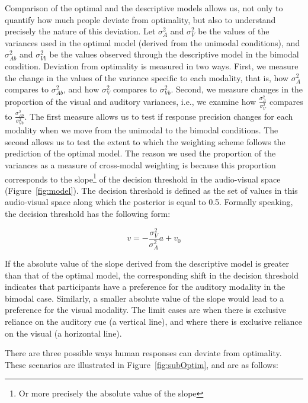 \documentclass[english,floatsintext,man]{apa6}
\theoremstyle{definition}
\theoremstyle{definition}
\theoremstyle{definition}
\theoremstyle{remark}
\begin{document}
Comparison of the optimal and the descriptive models allows us, not only
to quantify how much people deviate from optimality, but also to
understand precisely the nature of this deviation. Let \(\sigma^2_{A}\)
and \(\sigma^2_{V}\) be the values of the variances used in the optimal
model (derived from the unimodal conditions), and \(\sigma^2_{Ab}\) and
\(\sigma^2_{Vb}\) be the values observed through the descriptive model
in the bimodal condition. Deviation from optimality is measured in two
ways. First, we measure the change in the values of the variance
specific to each modality, that is, how \(\sigma^2_{A}\) compares to
\(\sigma^2_{Ab}\), and how \(\sigma^2_{V}\) compares to
\(\sigma^2_{Vb}\). Second, we measure changes in the proportion of the
visual and auditory variances, i.e., we examine how
\(\frac{\sigma^2_{A}}{\sigma^2_{V}}\) compares to
\(\frac{\sigma^2_{Ab}}{\sigma^2_{Vb}}\). The first measure allows us to
test if response precision changes for each modality when we move from
the unimodal to the bimodal conditions. The second allows us to test the
extent to which the weighting scheme follows the prediction of the
optimal model. The reason we used the proportion of the variances as a
measure of cross-modal weighting is because this proportion corresponds
to the slope\footnote{Or more precisely the absolute value of the slope}
of the decision threshold in the audio-visual space
(Figure~\ref{fig:model}). The decision threshold is defined as the set
of values in this audio-visual space along which the posterior is equal
to 0.5. Formally speaking, the decision threshold has the following
form:

\[v=-\frac{\sigma^2_V}{\sigma^2_A}a+v_0\]

If the absolute value of the slope derived from the descriptive model is
greater than that of the optimal model, the corresponding shift in the
decision threshold indicates that participants have a preference for the
auditory modality in the bimodal case. Similarly, a smaller absolute
value of the slope would lead to a preference for the visual modality.
The limit cases are when there is exclusive reliance on the auditory cue
(a vertical line), and where there is exclusive reliance on the visual
(a horizontal line).

There are three possible ways human responses can deviate from
optimality. These scenarios are illustrated in
Figure~\ref{fig:subOptim}, and are as follows:
\end{document}
